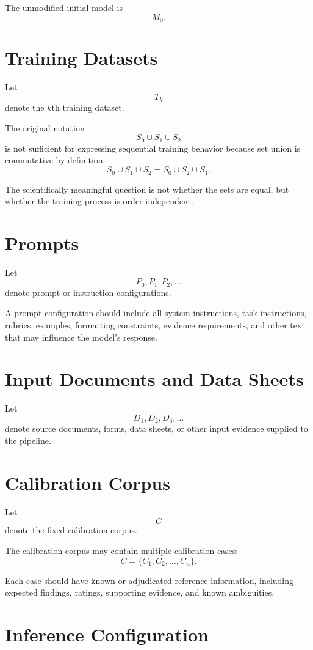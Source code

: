 \documentclass[11pt]{report}
\begin{document}
The unmodified initial model is
\[
M_0.
\]

\section{Training Datasets}

Let
\[
T_k
\]
denote the $k$th training dataset.

The original notation
\[
S_0 \cup S_1 \cup S_2
\]
is not sufficient for expressing sequential training behavior because set union is commutative by definition:
\[
S_0 \cup S_1 \cup S_2
=
S_0 \cup S_2 \cup S_1.
\]

The scientifically meaningful question is not whether the sets are equal, but whether the training process is order-independent.

\section{Prompts}

Let
\[
P_0,P_1,P_2,\ldots
\]
denote prompt or instruction configurations.

A prompt configuration should include all system instructions, task instructions, rubrics, examples, formatting constraints, evidence requirements, and other text that may influence the model's response.

\section{Input Documents and Data Sheets}

Let
\[
D_1,D_2,D_3,\ldots
\]
denote source documents, forms, data sheets, or other input evidence supplied to the pipeline.

\section{Calibration Corpus}

Let
\[
C
\]
denote the fixed calibration corpus.

The calibration corpus may contain multiple calibration cases:
\[
C=\{C_1,C_2,\ldots,C_n\}.
\]

Each case should have known or adjudicated reference information, including expected findings, ratings, supporting evidence, and known ambiguities.

\section{Inference Configuration}
\end{document}
